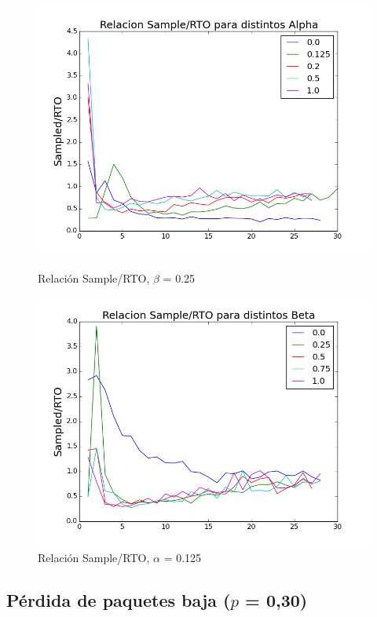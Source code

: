 \begin{figure}[H]
\begin{minipage}{0.5\linewidth}
\includegraphics[width=\linewidth]{../graficos/alphad025var5drop0.png}
\caption{Relación Sample/RTO, $\beta$ = 0.25}\label{fig:alpha-var5-drop0-alto}
\end{minipage}
\hfill
\begin{minipage}{0.5\linewidth}
\includegraphics[width=\linewidth]{../graficos/betad025var5drop0.png}
\caption{Relación Sample/RTO, $\alpha$ = 0.125}\label{fig:beta-var5-drop0-alto}
\end{minipage}
\end{figure}

\subsection{Pérdida de paquetes baja ($p$ = 0,30)}

